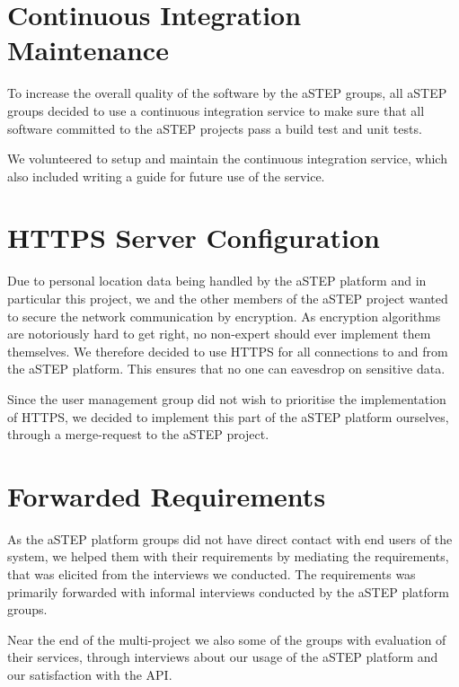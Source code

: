 \section{Continuous Integration Maintenance}
To increase the overall quality of the software by the aSTEP groups, all aSTEP groups decided to use a continuous integration service to make sure that all software committed to the aSTEP projects pass a build test and unit tests.

We volunteered to setup and maintain the continuous integration service, which also included writing a guide for future use of the service.

\section{HTTPS Server Configuration}
Due to personal location data being handled by the aSTEP platform and in particular this project, we and the other members of the aSTEP project wanted to secure the network communication by encryption. As encryption algorithms are notoriously hard to get right, no non-expert should ever implement them themselves. We therefore decided to use HTTPS for all connections to and from the aSTEP platform. This ensures that no one can eavesdrop on sensitive data.

Since the user management group did not wish to prioritise the implementation of HTTPS, we decided to implement this part of the aSTEP platform ourselves, through a merge-request to the aSTEP project.

\section{Forwarded Requirements}

As the aSTEP platform groups did not have direct contact with end users of the system, we helped them with their requirements by mediating the requirements, that was elicited from the interviews we conducted. The requirements was primarily forwarded with informal interviews conducted by the aSTEP platform groups.

Near the end of the multi-project we also  some of the groups with evaluation of their services, through interviews about our usage of the aSTEP platform and our satisfaction with the API.








